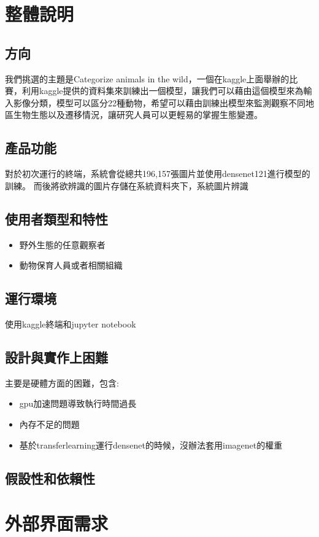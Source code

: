 \documentclass{scrreprt}
\begin{document}
\chapter{整體說明}
\section{方向}
我們挑選的主題是Categorize animals in the wild，一個在kaggle上面舉辦的比賽，利用kaggle提供的資料集來訓練出一個模型，讓我們可以藉由這個模型來為輸入影像分類，模型可以區分22種動物，希望可以藉由訓練出模型來監測觀察不同地區生物生態以及遷移情況，讓研究人員可以更輕易的掌握生態變遷。

\section{產品功能}
對於初次運行的終端，系統會從總共196,157張圖片並使用densenet121進行模型的訓練。
而後將欲辨識的圖片存儲在系統資料夾下，系統圖片辨識

\section{使用者類型和特性}
\begin{itemize}
\item 野外生態的任意觀察者
\item 動物保育人員或者相關組織
\end{itemize}

\section{運行環境}
使用kaggle終端和jupyter notebook

\section{設計與實作上困難}
主要是硬體方面的困難，包含:
\begin{itemize}
\item gpu加速問題導致執行時間過長
\item 內存不足的問題
\item 基於transferlearning運行densenet的時候，沒辦法套用imagenet的權重
\end{itemize}

\section{假設性和依賴性}


\chapter{外部界面需求}
\end{document}
